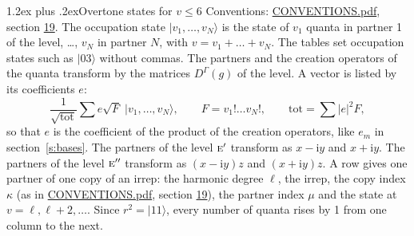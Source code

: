 \documentclass[10pt,a4paper]{article}
\makeatletter
\renewcommand\section{\@startsection{section}{1}{\z@}{-3ex plus -1ex minus -.2ex}%
  {1.2ex plus .2ex}{\normalfont\large\sffamily\bfseries\color{parttitle}}}
\numberwithin{equation}{section}
\newcommand{\irr}[1]{\text{\normalfont\scshape #1}}
\newcommand{\iunit}{\mathrm{i}}
\newcommand{\repD}[1]{D^{#1}}
\newcommand{\mult}{\kappa}
\newcommand{\intx}{\mu}
\newcommand{\occ}[1]{\lvert #1\rangle}
\makeatother
\begin{document}
\section{Overtone states for \texorpdfstring{$v \le 6$}{v \textleq\ 6}}\label{s:overtone_states}
Conventions: \href{../../CONVENTIONS.pdf}{CONVENTIONS.pdf}, section \href{../../CONVENTIONS.pdf\#conv.19}{19}.
\leavevmode\label{n:vector.occupation}\label{n:local.quanta.partner}\label{n:local.weight.occupation}The occupation state $\occ{v_1, \dots, v_N}$ is the state of $v_1$ quanta in partner 1 of the level, \dots, $v_N$ in partner $N$, with $v = v_1 + \dots + v_N$. The tables set occupation states such as $\occ{03}$ without commas. The partners and the creation operators of the quanta transform by the matrices $\repD{\Gamma}(g)$ of the level. A vector is listed by its coefficients $e$:
\begin{equation}\label{e:occupation}\frac{1}{\sqrt{\mathrm{tot}}}\sum e\sqrt{F}\;\occ{v_1, \dots, v_N},\qquad F = v_1!\dots v_N!,\qquad \mathrm{tot} = \sum |e|^2F,\end{equation}
so that $e$ is the coefficient of the product of the creation operators, like $e_m$ in section~\ref{s:bases}. The partners of the level $\irr{e}'$ transform as $x - \iunit y$ and $x + \iunit y$. The partners of the level $\irr{e}''$ transform as $(x - \iunit y) z$ and $(x + \iunit y) z$. A row gives one partner of one copy of an irrep: the harmonic degree $\ell$, the irrep, the copy index $\mult$ (as in \href{../../CONVENTIONS.pdf}{CONVENTIONS.pdf}, section \href{../../CONVENTIONS.pdf\#conv.19}{19}), the partner index $\intx$ and the state at $v = \ell, \ell + 2, \dots$. Since $r^2 = \occ{11}$, every number of quanta rises by 1 from one column to the next.
\end{document}

